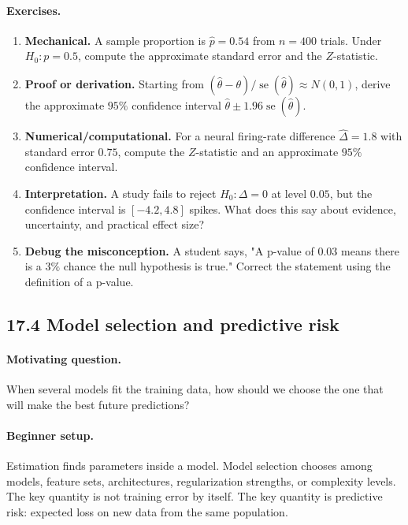 \paragraph{Exercises.}
\begin{enumerate}[label=\textbf{17.3.\arabic*.}, leftmargin=*]
\item \textbf{Mechanical.} A sample proportion is \(\hat p=0.54\) from \(n=400\) trials. Under \(H_0:p=0.5\), compute the approximate standard error and the \(Z\)-statistic.
\item \textbf{Proof or derivation.} Starting from \((\hat\theta-\theta)/\operatorname{se}(\hat\theta)\approx N(0,1)\), derive the approximate \(95\%\) confidence interval \(\hat\theta\pm1.96\operatorname{se}(\hat\theta)\).
\item \textbf{Numerical/computational.} For a neural firing-rate difference \(\hat\Delta=1.8\) with standard error \(0.75\), compute the \(Z\)-statistic and an approximate \(95\%\) confidence interval.
\item \textbf{Interpretation.} A study fails to reject \(H_0:\Delta=0\) at level \(0.05\), but the confidence interval is \([-4.2,4.8]\) spikes. What does this say about evidence, uncertainty, and practical effect size?
\item \textbf{Debug the misconception.} A student says, "A p-value of \(0.03\) means there is a \(3\%\) chance the null hypothesis is true." Correct the statement using the definition of a p-value.
\end{enumerate}

\subsection{17.4 Model selection and predictive risk}

\paragraph{Motivating question.}
When several models fit the training data, how should we choose the one that will make the best future predictions?

\paragraph{Beginner setup.}
Estimation finds parameters inside a model. Model selection chooses among models, feature sets, architectures, regularization strengths, or complexity levels. The key quantity is not training error by itself. The key quantity is predictive risk: expected loss on new data from the same population.

